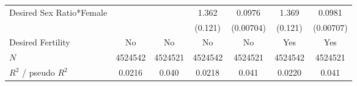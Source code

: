 \begin{table}[h!]
{\begin{tabular}{l*{6}{c}}
Desired Sex Ratio*Female&                     &                     &       1.362\sym{***}&      0.0976\sym{***}&       1.369\sym{***}&      0.0981\sym{***}\\
            &                     &                     &     (0.121)         &   (0.00704)         &     (0.121)         &   (0.00707)         \\


\hline
Desired Fertility&     No         &         No         &     No         &     No         &     Yes         &         Yes         \\
\hline
\(N\)       &     4524542         &     4524521         &     4524542         &     4524521         &     4524542         &     4524521         \\
$R^{2}$  / pseudo $R^{2}$& 0.0216  &       0.040         & 0.0218             &       0.041         &     0.0220          &       0.041         \\
\bottomrule
\end{tabular}}
\end{table}

